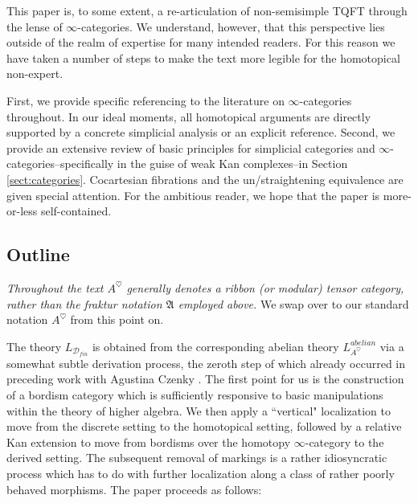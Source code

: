 \documentclass[reqno]{amsart}
\theoremstyle{definition}
\newcommand{\mfk}[1]{\mathfrak{#1}}
\newcommand{\msc}[1]{\mathscr{#1}}
\renewcommand{\1}{\mathbf{1}}
\begin{document}
This paper is, to some extent, a re-articulation of non-semisimple TQFT through the lense of $\infty$-categories.  We understand, however, that this perspective lies outside of the realm of expertise for many intended readers.  For this reason we have taken a number of steps to make the text more legible for the homotopical non-expert.
\par

First, we provide specific referencing to the literature on $\infty$-categories throughout. In our ideal moments, all homotopical arguments are directly supported by a concrete simplicial analysis or an explicit reference. Second, we provide an extensive review of basic principles for simplicial categories and $\infty$-categories--specifically in the guise of weak Kan complexes--in Section \ref{sect:categories}. Cocartesian fibrations and the un/straightening equivalence are given special attention.  For the ambitious reader, we hope that the paper is more-or-less self-contained.

\subsection{Outline}
{\it Throughout the text $A^{\heartsuit}$ generally denotes a ribbon (or modular) tensor category, rather than the fraktur notation $\mfk{A}$ employed above.}  We swap over to our standard notation $A^{\heartsuit}$ from this point on.
\par
  
The theory $L_{\msc{D}_{fin}}$ is obtained from the corresponding abelian theory $L^{abelian}_{A^{\heartsuit}}$ via a somewhat subtle derivation process, the zeroth step of which already occurred in preceding work with Agustina Czenky \cite{czenkynegron}.  The first point for us is the construction of a bordism category which is sufficiently responsive to basic manipulations within the theory of higher algebra.  We then apply a ``vertical" localization to move from the discrete setting to the homotopical setting, followed by a relative Kan extension to move from bordisms over the homotopy $\infty$-category to the derived setting.  The subsequent removal of markings is a rather idiosyncratic process which has to do with further localization along a class of rather poorly behaved morphisms.  The paper proceeds as follows:
\end{document}

